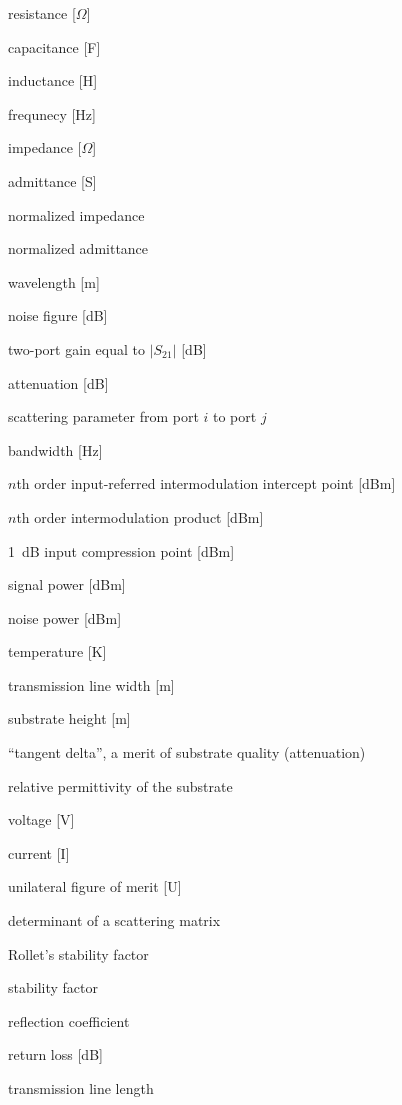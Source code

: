 \documentclass[a4paper, 12pt]{article}
\begin{document}
	\begin{description}[font=\rmfamily\mdseries, leftmargin=25.5mm, style=sameline, align=right, labelsep=5mm, itemsep=-2pt]
		\item[$R$]					resistance [$\Omega$]
		\item[$C$]					capacitance [F]
		\item[$L$]					inductance [H]
		\item[$f$] 					frequnecy [Hz]
		\item[$Z$] 					impedance [$\Omega$]
		\item[$Y$] 					admittance [S]
		\item[$z$] 					normalized impedance
		\item[$y$] 					normalized admittance
		\item[$\lambda$] 			wavelength [m]
		\item[$F$] 					noise figure [dB]
		\item[$G$] 					two-port gain equal to $|S_{21}|$ [dB]
		\item[$L$] 					attenuation [dB]
		\item[$S_{ij}$] 			scattering parameter from port $i$ to port $j$
		\item[$\mathit{BW}$] 		bandwidth [Hz]
		\item[$\mathit{IIP}_n$] 	$n$th order input-referred intermodulation intercept point [dBm]
		\item[$\mathit{IM}_n$] 		$n$th order intermodulation product [dBm]
		\item[$\mathit{ICP}$] 		1~dB input compression point [dBm]
		\item[$P$] 					signal power [dBm]
		\item[$N$] 					noise power [dBm]
		\item[$T$] 					temperature [K]
		\item[$w$] 					transmission line width [m]
		\item[$h$] 					substrate height [m]
		\item[$\tan \delta$]		``tangent delta'', a merit of substrate quality (attenuation)
		\item[$\epsilon_\mathrm{r}$]			relative permittivity of the substrate
		\item[$V$]					voltage [V]
		\item[$I$]					current [I]
		\item[$U$]					unilateral figure of merit [U]
		\item[$\Delta$]				determinant of a scattering matrix
		\item[$K$]					Rollet's stability factor
		\item[$\mu$]				stability factor
		\item[$\rho$]				reflection coefficient
		\item[$\textit{RL}$] 		return loss [dB]
		\item[$l$]					transmission line length
	\end{description}
\end{document}
